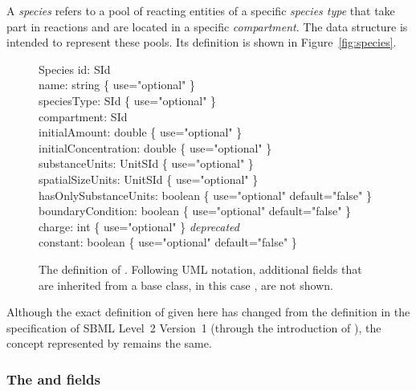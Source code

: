 A \emph{species} refers to a pool of reacting entities
of a specific \emph{species type} that take part in
reactions and are located in a specific \emph{compartment}.
The \Species data
structure is intended to represent these pools.   Its definition
is shown in Figure~\vref{fig:species}.

\begin{figure}[htb]
  \centering
  \begin{classbox}{Species}
    id: SId                                                             \\
    name: string \{ use="optional" \}                                   \\
    speciesType: SId \{ use="optional" \}                 \\
    compartment: SId                                                    \\
    initialAmount: double \{ use="optional" \}                          \\
    initialConcentration: double \{ use="optional" \}                  \\
    substanceUnits: UnitSId \{ use="optional" \}          \\
    spatialSizeUnits: UnitSId \{ use="optional" \}        \\
    hasOnlySubstanceUnits: boolean \{ use="optional" default="false" \} \\
    boundaryCondition: boolean \{ use="optional" default="false" \}     \\
    charge: int \{ use="optional" \} \emph{deprecated}    \\
    constant: boolean \{ use="optional" default="false" \}              \\
  \end{classbox}
  \caption{The definition of \Species.  Following UML notation,
    additional fields
    that are inherited from a base class, in this case \SBase, are not shown.}
  \label{fig:species}
\end{figure}

Although the exact definition of \Species given here has
changed from the definition in the specification of SBML Level~2
Version~1 (\ie through the introduction of \SpeciesType), the
concept represented by \Species remains the same.



\subsubsection{The  and  fields}

